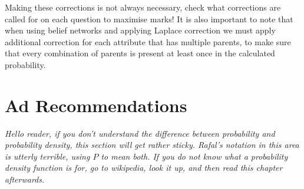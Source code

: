 \documentclass{article}
\begin{document}
    Making these corrections is not always necessary, check what corrections are called for on each question to maximise marks! It is also important to note that when using belief networks and applying Laplace correction we must apply additional correction for each attribute that has multiple parents, to make sure that every combination of parents is present at least once in the calculated probability.
    
    
\section{Ad Recommendations}

    \emph{Hello reader, if you don't understand the difference between probability and probability density, this section will get rather sticky. Rafal's notation in this area is utterly terrible, using $P$ to mean both. If you do not know what a probability density function is for, go to wikipedia, look it up, and then read this chapter afterwards.}
\end{document}
